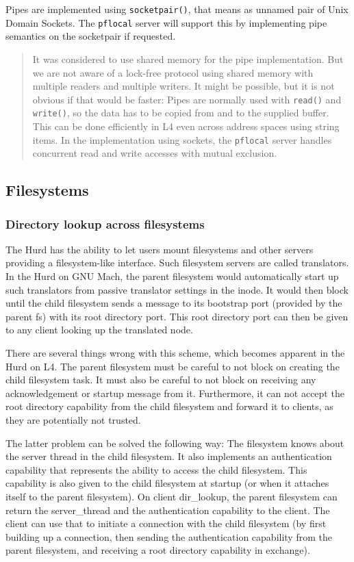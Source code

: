 \documentclass[9pt,a4paper]{extarticle}
\newenvironment{comment}{\footnotesize \begin{quote}}{\end{quote}}
\begin{document}
Pipes are implemented using \texttt{socketpair()}, that means as
unnamed pair of Unix Domain Sockets.  The \texttt{pflocal} server will
support this by implementing pipe semantics on the socketpair if
requested.

\begin{comment}
  It was considered to use shared memory for the pipe implementation.
  But we are not aware of a lock-free protocol using shared memory
  with multiple readers and multiple writers.  It might be possible,
  but it is not obvious if that would be faster: Pipes are normally
  used with \texttt{read()} and \texttt{write()}, so the data has to
  be copied from and to the supplied buffer.  This can be done
  efficiently in L4 even across address spaces using string items.  In
  the implementation using sockets, the \texttt{pflocal} server
  handles concurrent read and write accesses with mutual exclusion.
\end{comment}


\subsection{Filesystems}

\subsubsection{Directory lookup across filesystems}
\label{xfslookup}

The Hurd has the ability to let users mount filesystems and other
servers providing a filesystem-like interface.  Such filesystem
servers are called translators.  In the Hurd on GNU Mach, the parent
filesystem would automatically start up such translators from passive
translator settings in the inode.  It would then block until the child
filesystem sends a message to its bootstrap port (provided by the
parent fs) with its root directory port.  This root directory port can
then be given to any client looking up the translated node.

There are several things wrong with this scheme, which becomes
apparent in the Hurd on L4.  The parent filesystem must be careful to
not block on creating the child filesystem task.  It must also be
careful to not block on receiving any acknowledgement or startup
message from it.  Furthermore, it can not accept the root directory
capability from the child filesystem and forward it to clients, as
they are potentially not trusted.

The latter problem can be solved the following way: The filesystem
knows about the server thread in the child filesystem.  It also
implements an authentication capability that represents the ability to
access the child filesystem.  This capability is also given to the
child filesystem at startup (or when it attaches itself to the parent
filesystem).  On client dir\_lookup, the parent filesystem can return
the server\_thread and the authentication capability to the client.
The client can use that to initiate a connection with the child
filesystem (by first building up a connection, then sending the
authentication capability from the parent filesystem, and receiving a
root directory capability in exchange).
\end{document}
